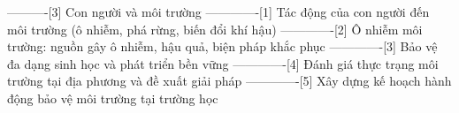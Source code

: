 ----------[3] Con người và môi trường
-------------[1] Tác động của con người đến môi trường (ô nhiễm, phá rừng, biến đổi khí hậu)
-------------[2] Ô nhiễm môi trường: nguồn gây ô nhiễm, hậu quả, biện pháp khắc phục
-------------[3] Bảo vệ đa dạng sinh học và phát triển bền vững
-------------[4] Đánh giá thực trạng môi trường tại địa phương và đề xuất giải pháp
-------------[5] Xây dựng kế hoạch hành động bảo vệ môi trường tại trường học